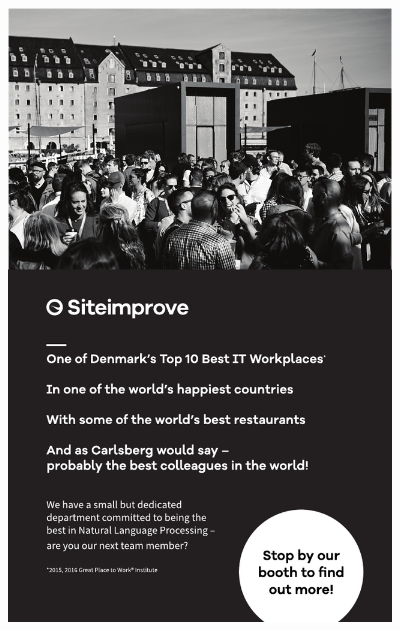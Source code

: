 \thispagestyle{empty}
\begin{center}
  \vfill
  \includegraphics[width=4in]{content/ads/platinum/siteimprove.pdf}
  \vfill
\end{center}
\clearpage

